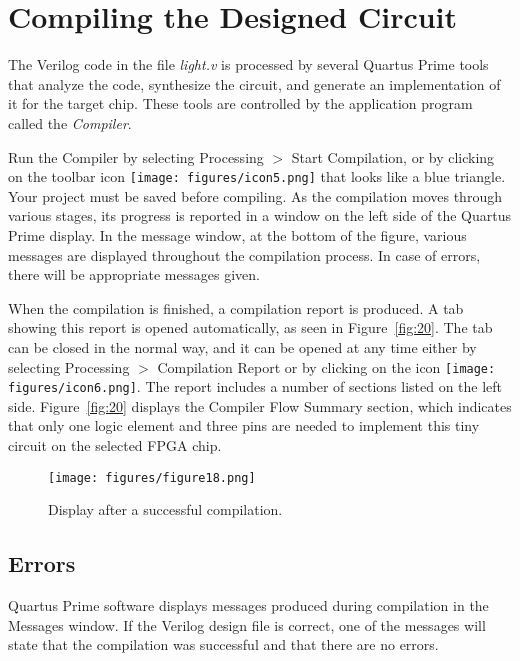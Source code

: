 \section{Compiling the Designed Circuit}


The Verilog code in the file {\it light.v} is processed by several 
Quartus Prime tools that analyze the code, synthesize the circuit,
and generate an implementation of it for the target chip. 
These tools are controlled by the application program called the {\it Compiler}.

Run the Compiler by selecting {\sf Processing $>$ Start Compilation}, or by 
clicking on the toolbar icon \texttt{[image: figures/icon5.png]} that looks like a
blue triangle. Your project must be saved before compiling. 
As the compilation moves through various stages, its progress is reported
in a window on the left side of the Quartus Prime display.
In the message window, at the bottom of the figure, various messages are displayed
throughout the compilation process.
In case of errors, there will be appropriate messages given.

When the compilation is finished, a compilation report is produced.
A tab showing this report is opened automatically, as seen in Figure~\ref{fig:20}.
The tab can be closed in the normal way, and it can be opened at any time
either by selecting {\sf Processing $>$ Compilation Report} or by clicking on 
the icon \texttt{[image: figures/icon6.png]}.
The report includes a number of sections listed on the left side.
Figure~\ref{fig:20} displays the Compiler Flow Summary section, which
indicates that only one logic element and three pins are needed to implement this 
tiny circuit on the selected FPGA chip.

\begin{figure}[H]
   \begin{center}
      \texttt{[image: figures/figure18.png]}
   \caption{Display after a successful compilation.} 
	 \label{fig:18}
	 \end{center}
\end{figure}

\subsection{Errors}

Quartus Prime software displays messages produced during compilation in the Messages window.
If the Verilog design file is correct, one of the messages will
state that the compilation was successful and that there are no
errors.

